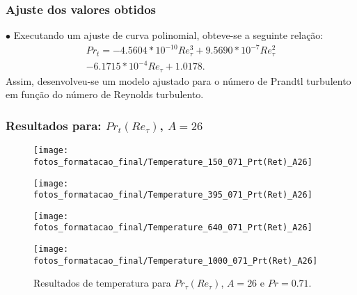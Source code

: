 \documentclass[xcolor=dvipsnames,10pt,aspectratio=169]{beamer}
\begin{document}
	
	
	
		\begin{frame}
		\frametitle{Ajuste dos valores obtidos}
			$\bullet$ Executando um ajuste de curva polinomial, obteve-se a seguinte relação:
      \begin{equation}
        \begin{split}
          Pr_t = -4.5604 * 10^{-10} Re_\tau^3 + 9.5690 * 10^{-7} Re_\tau^2\\
          - 6.1715 *10 ^{-4} Re_\tau + 1.0178 .
        \end{split}
      \end{equation}
			Assim, desenvolveu-se um modelo ajustado para o número de Prandtl turbulento em função do número de Reynolds turbulento.
		\end{frame}	


    \begin{frame}
		\frametitle{Resultados para: $Pr_t(Re_\tau)$, $A = 26$}
    \begin{figure}[!h]
        \centering
        \begin{minipage}[t]{0.5\textwidth}
          \centering
          \texttt{[image: fotos\_formatacao\_final/Temperature\_150\_071\_Prt(Ret)\_A26]}
          \caption{$Re_\tau = 150$, $L2_t = 0.26$}
        \end{minipage}
        \begin{minipage}[t]{0.45\textwidth}
          \centering
          \texttt{[image: fotos\_formatacao\_final/Temperature\_395\_071\_Prt(Ret)\_A26]}
          \caption{$Re_\tau = 395$, $L2_t = 0.22$}
        \end{minipage}
        \begin{minipage}[t]{0.5\textwidth}
          \centering
          \texttt{[image: fotos\_formatacao\_final/Temperature\_640\_071\_Prt(Ret)\_A26]}
          \caption{$Re_\tau = 640$, $L2_t = 0.17$}
        \end{minipage}
        \begin{minipage}[t]{0.45\textwidth}
          \centering
          \texttt{[image: fotos\_formatacao\_final/Temperature\_1000\_071\_Prt(Ret)\_A26]}
          \caption{$Re_\tau = 1020$, $L2_t = 0.14$}
        \end{minipage}	
        \caption{Resultados de temperatura para $Pr_\tau(Re_\tau)$, $A = 26$ e $Pr =0.71$. }
        \label{figura_9}
      \end{figure}

		\end{frame}	
\end{document}
